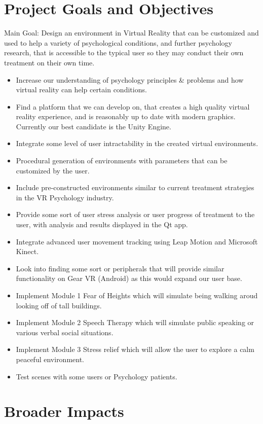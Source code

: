 \documentclass[a4paper,10pt]{article}
\begin{document}
\section{Project Goals and Objectives}
	Main Goal: Design an environment in Virtual Reality that can be customized and used to help a variety of psychological conditions, and further psychology research, that is accessible to the typical user so they may conduct their own treatment on their own time.
	\begin{itemize}
		\item Increase our understanding of psychology principles \& problems and how virtual reality can help certain conditions.
		\item Find a platform that we can develop on, that creates a high quality virtual reality experience, and is reasonably up to date with modern graphics. Currently our best candidate is the Unity Engine.
		\item Integrate some level of user intractability in the created virtual environments. 
		\item Procedural generation of environments with parameters that can be customized by the user.
		\item Include pre-constructed environments similar to current treatment strategies in the VR Psychology industry.
		\item Provide some sort of user stress analysis or user progress of treatment to the user, with analysis and results displayed in the Qt app.
		\item Integrate advanced user movement tracking using Leap Motion and Microsoft Kinect.
		\item Look into finding some sort or peripherals that will provide similar functionality on Gear VR (Android) as this would expand our user base.
		\item Implement Module 1 Fear of Heights which will simulate being walking aroud looking off of tall buildings.
		\item Implement Module 2 Speech Therapy which will simulate public speaking or various verbal social situations. 
		\item Implement Module 3 Stress relief which will allow the user to explore a calm peaceful environment.
		\item Test scenes with some users or Psychology patients.
		
	\end{itemize}
	\pagebreak
	\section{Broader Impacts}
	
\end{document}
